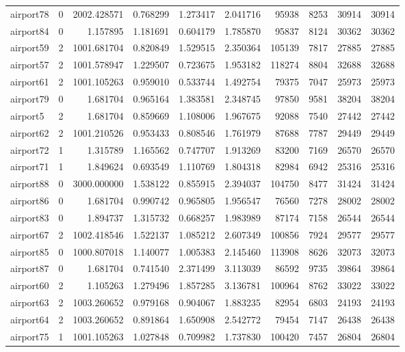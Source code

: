 \begin{longtable}{|l|r|r|r|r|r|r|r|r|r|}
airport78 & 0 & 2002.428571 & 0.768299 & 1.273417 & 2.041716 & 95938 & 8253 & 30914 & 30914 \\
airport84 & 0 & 1.157895 & 1.181691 & 0.604179 & 1.785870 & 95837 & 8124 & 30362 & 30362 \\
airport59 & 2 & 1001.681704 & 0.820849 & 1.529515 & 2.350364 & 105139 & 7817 & 27885 & 27885 \\
airport57 & 2 & 1001.578947 & 1.229507 & 0.723675 & 1.953182 & 118274 & 8804 & 32688 & 32688 \\
airport61 & 2 & 1001.105263 & 0.959010 & 0.533744 & 1.492754 & 79375 & 7047 & 25973 & 25973 \\
airport79 & 0 & 1.681704 & 0.965164 & 1.383581 & 2.348745 & 97850 & 9581 & 38204 & 38204 \\
airport5 & 2 & 1.681704 & 0.859669 & 1.108006 & 1.967675 & 92088 & 7540 & 27442 & 27442 \\
airport62 & 2 & 1001.210526 & 0.953433 & 0.808546 & 1.761979 & 87688 & 7787 & 29449 & 29449 \\
airport72 & 1 & 1.315789 & 1.165562 & 0.747707 & 1.913269 & 83200 & 7169 & 26570 & 26570 \\
airport71 & 1 & 1.849624 & 0.693549 & 1.110769 & 1.804318 & 82984 & 6942 & 25316 & 25316 \\
airport88 & 0 & 3000.000000 & 1.538122 & 0.855915 & 2.394037 & 104750 & 8477 & 31424 & 31424 \\
airport86 & 0 & 1.681704 & 0.990742 & 0.965805 & 1.956547 & 76560 & 7278 & 28002 & 28002 \\
airport83 & 0 & 1.894737 & 1.315732 & 0.668257 & 1.983989 & 87174 & 7158 & 26544 & 26544 \\
airport67 & 2 & 1002.418546 & 1.522137 & 1.085212 & 2.607349 & 100856 & 7924 & 29577 & 29577 \\
airport85 & 0 & 1000.807018 & 1.140077 & 1.005383 & 2.145460 & 113908 & 8626 & 32073 & 32073 \\
airport87 & 0 & 1.681704 & 0.741540 & 2.371499 & 3.113039 & 86592 & 9735 & 39864 & 39864 \\
airport60 & 2 & 1.105263 & 1.279496 & 1.857285 & 3.136781 & 100964 & 8762 & 33022 & 33022 \\
airport63 & 2 & 1003.260652 & 0.979168 & 0.904067 & 1.883235 & 82954 & 6803 & 24193 & 24193 \\
airport64 & 2 & 1003.260652 & 0.891864 & 1.650908 & 2.542772 & 79454 & 7147 & 26438 & 26438 \\
airport75 & 1 & 1001.105263 & 1.027848 & 0.709982 & 1.737830 & 100420 & 7457 & 26804 & 26804 \\

\end{longtable}
